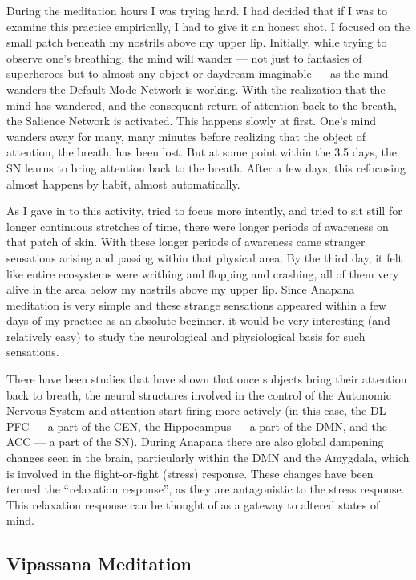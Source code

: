 \documentclass[a4paper, amsfonts, amssymb, amsmath, reprint, showkeys, nofootinbib, twoside]{revtex4-1}
\begin{document}
During the meditation hours I was trying hard. I had decided that if I was to examine this practice
empirically, I had to give it an honest shot. I focused on the small patch beneath my
nostrils above my upper lip. Initially, while trying to observe one's breathing, the
mind will wander --- not just to fantasies of superheroes but to almost any object or
daydream imaginable --- as the mind wanders the Default Mode Network is working. With
the realization that the mind has wandered, and the consequent return of attention
back to the breath, the Salience Network is
activated. This happens slowly at first. One's mind wanders away for many, many
minutes before realizing that the object of attention, the breath, has been lost. But
at some point within the 3.5 days, the SN learns to bring attention back to the breath. After a few days, this
refocusing almost happens by habit, almost automatically.

As I gave in to this activity, tried to focus more intently, and tried to sit still for
longer continuous stretches of time, there were longer periods of awareness on that
patch of skin. With these longer periods of awareness came
stranger sensations arising and passing within that physical area. By the third day,
it felt like entire ecosystems were writhing and flopping and crashing, all of them
very alive in the area below my nostrils above my upper lip. Since Anapana meditation
is very simple and these strange sensations appeared within a few days of my practice
as an absolute beginner, it would be very interesting (and relatively easy) to study
the neurological and physiological basis for such sensations.

There have been studies that have shown that once subjects bring their
attention back to breath, the neural structures involved in the control
of the Autonomic Nervous System and attention start firing more actively
(in this case, the DL-PFC --- a part of the CEN, the Hippocampus --- a part of the
DMN, and the ACC --- a part of the SN). During Anapana there are also global
dampening changes seen in the brain, particularly within the DMN and the Amygdala, which is involved in
the flight-or-fight (stress) response. These changes have been
termed the ``relaxation response'', as they are antagonistic to the stress
response. This relaxation response can be thought of as a gateway to altered states
of mind. \cite{relaxationresponse}

\subsection{Vipassana Meditation}
\end{document}
